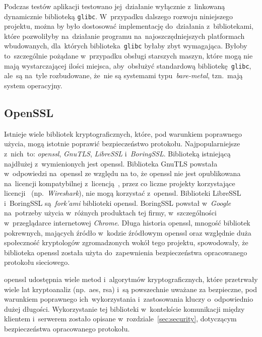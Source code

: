 \documentclass[thesis]{subfiles}
\begin{document}
Podczas testów aplikacji testowano jej~działanie wyłącznie z~linkowaną dynamicznie biblioteką \texttt{glibc}. W~przypadku dalszego rozwoju niniejszego projektu, można by było dostosować implementację do~działania z~bibliotekami, które pozwoliłyby na~działanie programu na~najoszczędniejszych platformach wbudowanych, dla~których biblioteka~\texttt{glibc} byłaby zbyt wymagająca. Byłoby to~szczególnie pożądane w~przypadku obsługi starszych maszyn, które mogą nie mają wystarczającej ilości miejsca, aby~obsłużyć standardową bibliotekę~\texttt{glibc}, ale~są na~tyle rozbudowane, że~nie są systemami typu~\emph{bare-metal}, tzn.~mają system operacyjny.


\subsection{OpenSSL}

Istnieje wiele bibliotek kryptograficznych, które, pod warunkiem poprawnego użycia, mogą istotnie poprawić bezpieczeństwo protokołu. Najpopularniejsze z~nich~to: \emph{\gls{openssl}}, \emph{GnuTLS}, \emph{LibreSSL} i~\emph{BoringSSL}. Biblioteką istniejącą najdłużej z~wymienionych jest \gls{openssl}. Biblioteka GnuTLS powstała w~odpowiedzi na~\gls{openssl} ze względu na to, że \gls{openssl} nie jest opublikowana na~licencji kompatybilnej z~licencją~, przez co liczne projekty korzystające licencji~ (np.~\emph{Wireshark}), nie mogą korzystać z~\gls{openssl}. Biblioteki LibreSSL i~BoringSSL są~\emph{fork'ami} biblioteki \gls{openssl}. BoringSSL powstał w~\emph{Google} na~potrzeby użycia w~różnych produktach tej firmy, w~szczególności w~przeglądarce internetowej \emph{Chrome}. Długa historia \gls{openssl}, mnogość bibliotek pokrewnych, mających źródło w~kodzie źródłowym \gls{openssl} oraz względnie duża społeczność kryptologów zgromadzonych wokół tego projektu, spowodowały, że biblioteka \gls{openssl} została użyta do~zapewnienia bezpieczeństwa opracowanego protokołu sieciowego.

\gls{openssl} udostępnia wiele metod i~algorytmów kryptograficznych, które przetrwały wiele lat kryptoanaliz (np.~\gls{aes}, \gls{rsa}) i~są powszechnie uważane za bezpieczne, pod warunkiem poprawnego ich~wykorzystania i~zastosowania kluczy o~odpowiednio dużej długości. Wykorzystanie tej biblioteki w~kontekście komunikacji między klientem i~serwerem zostało opisane w~rozdziale~\ref{sec:security}, dotyczącym bezpieczeństwa opracowanego protokołu.
\end{document}
